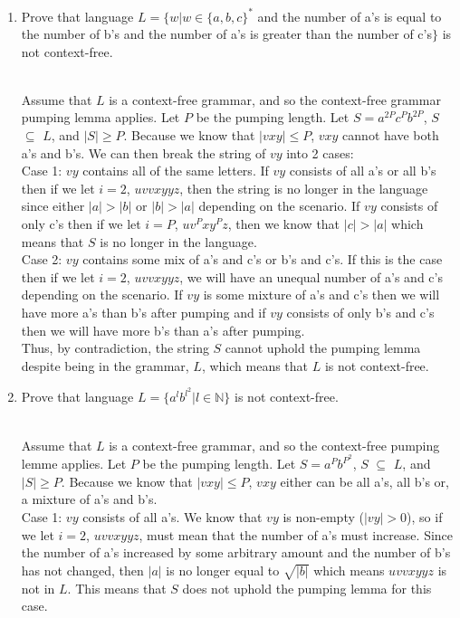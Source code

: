 \documentclass[11pt]{article}
\theoremstyle{definition}
\theoremstyle{theorem}
\newcommand{\solution}{\medskip\noindent{\color{blue}\textbf{Solution:}}}
\begin{document}
\begin{enumerate}[label=(\alph*)]

\item Prove that language $L = \{w | w \in \{a,b,c\}^*$ and the number of a's is equal to the number of b's and the number of a's is greater than the number of c's$\}$ is not context-free.

\solution \\
Assume that $L$ is a context-free grammar, and so the context-free grammar pumping lemma applies. Let $P$ be the pumping length. Let $S = a^{2P}c^{P}b^{2P}$,  $S$ $\subseteq$ $L$, and $|S| \geq P$. Because we know that $|vxy| \leq P$, $vxy$ cannot have both a's and b's. We can then break the string of $vy$ into 2 cases: \\

Case 1: $vy$ contains all of the same letters. If $vy$ consists of all a's or all b's then if we let $i = 2$, $uvvxyyz$, then the string is no longer in the language since either $|a| > |b|$ or $|b| > |a|$ depending on the scenario. If $vy$ consists of only c's then if we let $i = P$, $uv^Pxy^Pz$, then we know that $|c| > |a|$ which means that $S$ is no longer in the language. \\ 

Case 2: $vy$ contains some mix of a's and c's or b's and c's. If this is the case then if we let $i = 2$, $uvvxyyz$, we will have an unequal number of a's and c's depending on the scenario. If $vy$ is some mixture of a's and c's then we will have more a's than b's after pumping and if $vy$ consists of only b's and c's then we will have more b's than a's after pumping. \\

Thus, by contradiction, the string $S$ cannot uphold the pumping lemma despite being in the grammar, $L$, which means that $L$ is not context-free.
\item Prove that language $L = \{a^l b^{l^2} | l \in \mathbb{N}\}$ is not context-free.

\solution \\
Assume that $L$ is a context-free grammar, and so the context-free pumping lemme applies. Let $P$ be the pumping length. Let $S = a^Pb^{P^2}$, $S$ $\subseteq$ $L$, and $|S| \geq P$. Because we know that $|vxy| \leq P$, $vxy$ either can be all a's, all b's or, a mixture of a's and b's. \\

Case 1: $vy$ consists of all a's. We know that $vy$ is non-empty ($|vy| > 0$), so if we let $i = 2$, $uvvxyyz$, must mean that the number of a's must increase. Since the number of a's increased by some arbitrary amount and the number of b's has not changed, then $|a|$ is no longer equal to $\sqrt{|b|}$ which means $uvvxyyz$ is not in $L$. This means that $S$ does not uphold the pumping lemma for this case. \\


\end{enumerate}
\end{document}
